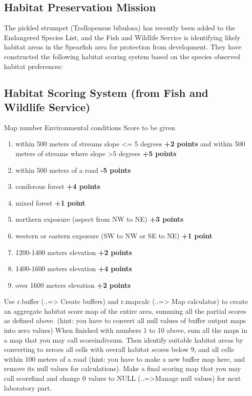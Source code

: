 \subsection{Habitat Preservation Mission}
The pickled strumpet (Trollopensus bibulosa) has recently been added to the Endangered Species List, and the Fish and Wildlife Service is identifying likely habitat areas in the Spearfish area for protection from development. They have constructed the following habitat scoring system based on the species observed habitat preferences:

\subsection{Habitat Scoring System (from Fish and Wildlife Service) }

Map number Environmental conditions Score to be given
\begin{enumerate}
 \item within 500 meters of streams slope <= 5 degrees \textbf{+2 points} and within 500 meters of streams where slope >5 degrees \textbf{+5 points}
 \item within 500 meters of a road \textbf{-5 points}
 \item coniferous forest \textbf{+4 points}
 \item mixed forest \textbf{+1 point}
 \item northern exposure (aspect from NW to NE) \textbf{+3 points}
 \item western or eastern exposure (SW to NW or SE to NE) \textbf{+1 point}
 \item 1200-1400 meters elevation \textbf{+2 points}
 \item 1400-1600 meters elevation \textbf{+4 points}
 \item over 1600 meters elevation \textbf{+2 points}
\end{enumerate}

Use r.buffer (..=> Create buffers) and r.mapcalc (..=> Map calculator) to create an aggregate habitat score map of the entire area, summing all the partial scores as defined above. (hint: you have to convert all null values of buffer output maps into zero values)
When finished with numbers 1 to 10 above, sum all the maps in a map that you may call scoreindivsum. Then identify suitable habitat areas by converting to zeroes all cells with overall habitat scores below 9, and all cells within 100 meters of a road (hint: you have to make a new buffer map here, and remove its null values for calculations). Make a final scoring map that you may call scorefinal and change 0 values to NULL (..=>Manage null values) for next laboratory part.

